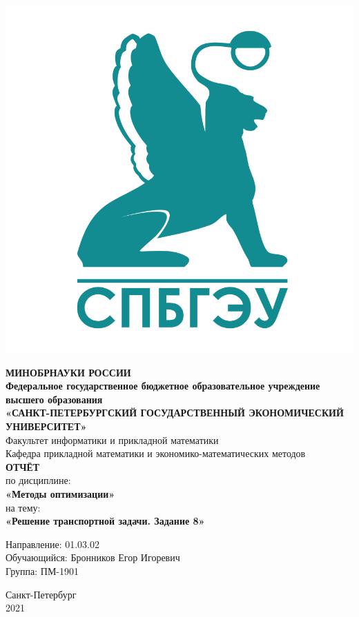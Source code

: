 \documentclass[14pt,a4paper,fleqn]{extarticle}
\begin{document}
	\begin{titlepage}
		\includegraphics[scale=0.12]{logo}
		\begin{center}
			\textbf{МИНОБРНАУКИ РОССИИ}\\
			\vspace{0.2cm}
			\textbf{Федеральное государственное бюджетное образовательное учреждение высшего образования}\\
			\textbf{«САНКТ-ПЕТЕРБУРГСКИЙ ГОСУДАРСТВЕННЫЙ ЭКОНОМИЧЕСКИЙ УНИВЕРСИТЕТ»}\\
			\vspace{0.6cm}
			Факультет информатики и прикладной математики\\
			Кафедра прикладной математики и экономико-математических методов\\
			\vspace{1cm}
			\textbf{ОТЧЁТ}\\
			по дисциплине:\\
			\textbf{«Методы оптимизации»}\\
			на тему:\\
			\textbf{«Решение транспортной задачи. Задание 8»}\\
		\end{center}
		\vspace{1cm}
		Направление: 01.03.02\\
		Обучающийся: Бронников Егор Игоревич\\
		Группа: ПМ-1901\\
		\vfill
		\begin{center}
			Санкт-Петербург\\
			2021\\
		\end{center}
	\end{titlepage}
\end{document}
